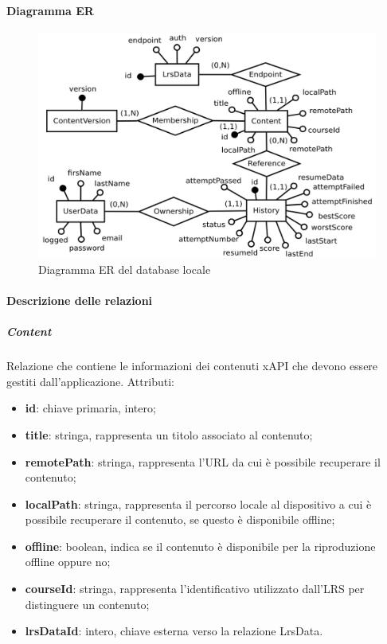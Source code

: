 \documentclass[../Tesi.tex]{subfiles}
\begin{document}
			\paragraph{Diagramma ER}	
			\hfill \break
				\begin{figure} [H]
					\centering
					\includegraphics[scale=0.4]{images/er/RealmDB}
						\caption{Diagramma ER del database locale}
				\end{figure}

			\paragraph{Descrizione delle relazioni}
			\subparagraph*{Content}
			Relazione che contiene le informazioni dei contenuti xAPI che devono essere gestiti dall'applicazione. Attributi:
			\begin{itemize}
				\item \textbf{id}: chiave primaria, intero;
				\item \textbf{title}: stringa, rappresenta un titolo associato al contenuto;
				\item \textbf{remotePath}: stringa, rappresenta l'URL da cui è possibile recuperare il contenuto;
				\item \textbf{localPath}: stringa, rappresenta il percorso locale al dispositivo a cui è possibile recuperare il contenuto, se questo è disponibile offline;
				\item \textbf{offline}: boolean, indica se il contenuto è disponibile per la riproduzione offline oppure no;
				\item \textbf{courseId}: stringa, rappresenta l'identificativo utilizzato dall'LRS per distinguere un contenuto;
				\item \textbf{lrsDataId}: intero, chiave esterna verso la relazione LrsData.
			\end{itemize}
\end{document}
